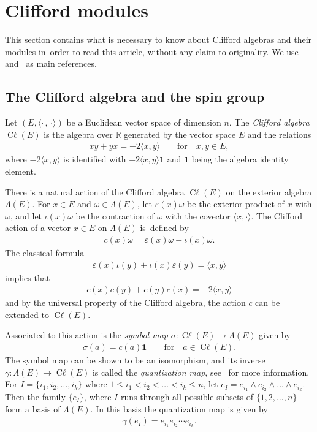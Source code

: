 \documentclass[10pt,a4paper]{amsart}
\DeclareMathOperator{\cl}{C\ell} %
\numberwithin{equation}{section}
\begin{document}
\section{Clifford modules}\vspace{-1ex}

This section contains what is necessary to know about Clifford algebras and their modules in~order to read this article, without any claim to originality. We use~\cite{dss} and~\cite{bgv} as main references.

\subsection{The Clifford algebra and the spin group}

Let $(E, \langle \cdot\,,\,\cdot\rangle)$ be a Euclidean vector space of dimension $n$. The \emph{Clifford algebra} $\cl(E)$ is the algebra over $\mathbb R$ generated by the vector space $E$ and the relations
\begin{gather*}
xy +yx=-2\langle x,y\rangle\qquad \text{for}\quad x, y \in E,
\end{gather*}
where $-2\langle x,y\rangle$ is identified with $-2\langle x,y\rangle \mathbf{1}$ and $\mathbf{1}$ being the algebra identity element.

There is a natural action of the Clifford algebra $\cl(E)$ on the exterior algebra $\Lambda(E)$. For $x\in E $ and $\omega\in \Lambda(E)$, let $\varepsilon(x)\omega$ be the exterior product of $x$ with $\omega$, and let $\iota(x)\omega$ be the contraction of $\omega$ with the covector $\langle x, \cdot\rangle$. The Clifford action of a vector $x\in E$ on $\Lambda(E)$ is~defined by
\begin{gather*}
c(x) \omega = \varepsilon(x) \omega - \iota(x) \omega.
\end{gather*}
The classical formula
\begin{gather*}\varepsilon(x) \iota(y) + \iota(x) \varepsilon(y) = \langle x,y\rangle
\end{gather*}
implies that
\begin{gather*}
c(x)c(y)+c(y)c(x) = -2\langle x,y\rangle
\end{gather*}
and by the universal property of the Clifford algebra, the action $c$ can be extended to $\cl(E)$.

Associated to this action is the \emph{symbol map} $\sigma \colon \cl(E) \to \Lambda(E)$ given by
\begin{gather*}
\sigma(a) = c(a) \mathbf{1}\qquad \text{for}\quad a \in \cl(E).
\end{gather*}
The symbol map can be shown to be an isomorphism, and its inverse $\gamma \colon \Lambda(E) \to \cl(E)$ is called the \emph{quantization map}, see~\cite{bgv} for more information. For $I=\{ i_1, i_2,\dots,i_k\}$ where $1\leq i_1<i_2<\dots<i_k\leq n$, let $e_I = e_{i_1}\wedge e_{i_2}\wedge\dots\wedge e_{i_k}$. Then the family $\{e_I\}$, where $I$ runs through all possible subsets of $\{1,2,\dots,n\}$ form a basis of $\Lambda(E)$. In this basis the quantization map is given by
\begin{gather}\label{gamma}
\gamma(e_I) =e_{i_1}e_{i_2}\cdots e_{i_k}.
\end{gather}
\end{document}

